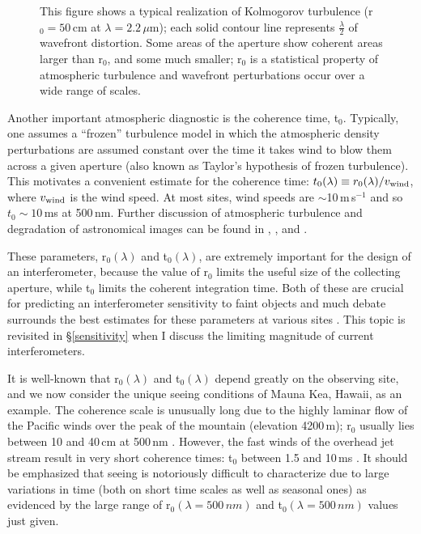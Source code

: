 \documentclass[12pt]{article}
\newcommand{\micronn}{\,\hbox{$\mu$m}}
\begin{document}
\begin{figure}
\begin{center}
\caption[bad atmosphere]{
This figure
shows a typical realization of Kolmogorov turbulence (r$_0 = 50$\,cm at
$\lambda = 2.2$\micronn); each
solid contour line represents $\frac{\lambda}{2}$ of wavefront distortion.
Some areas of the aperture show coherent areas larger
than r$_0$, and some much smaller; r$_0$ is a statistical property of
atmospheric turbulence and wavefront perturbations occur over a wide
range of scales.
\label{fig:phasescreen}}
\end{center}
\end{figure}

Another important atmospheric diagnostic is the coherence time, t$_0$.
Typically, one assumes a ``frozen'' turbulence model in which the
atmospheric density perturbations are assumed constant over the time
it takes wind to blow them across a given aperture (also known as
Taylor's hypothesis of frozen turbulence).  This motivates a convenient
estimate for the coherence time: $t_0(\lambda) \equiv r_0(\lambda) /
v_{\rm wind}$, where $v_{\rm wind}$ is the wind speed.  At most sites,
wind speeds are $\sim$10\,m\,s$^{-1}$ and so $t_0 \sim 10$\,ms at
500\,nm.  Further discussion of atmospheric turbulence and degradation
of astronomical images can be found in \citet{kolmogorov61},
\citet{roddier1981}, and \citet{roddier82}.

These parameters, r$_0(\lambda)$ and t$_0(\lambda)$, are extremely
important for the design of an interferometer, because the value of
r$_0$ limits the useful size of the collecting aperture, while t$_0$
limits the coherent integration time.  Both of these are crucial for
predicting an interferometer sensitivity to faint objects and much
debate surrounds the best estimates for these parameters at various
sites \citep[e.g.,][]{dyck83a, roddier90, theo1994, treuhaft95}.  This
topic is revisited in \S\ref{sensitivity} when I discuss the limiting
magnitude of current interferometers.

It is well-known that r$_0(\lambda)$ and t$_0(\lambda)$ depend greatly
on the observing site, and we now consider the unique seeing
conditions of Mauna Kea, Hawaii, as an example.  The coherence scale
is unusually long due to the highly laminar flow of the Pacific winds
over the peak of the mountain (elevation 4200\,m); r$_0$ usually lies
between 10 and 40\,cm at 500\,nm \citep{wizPC}.  However, the fast
winds of the overhead jet stream result in very short coherence times:
t$_0$ between 1.5 and 10\,ms \citep{wizPC}.  It should be emphasized
that seeing is notoriously difficult to characterize due to large
variations in time (both on short time scales as well as seasonal
ones) as evidenced by the large range of r$_0(\lambda = 500\,nm)$ and
t$_0(\lambda=500\,nm)$ values just given.
\end{document}
